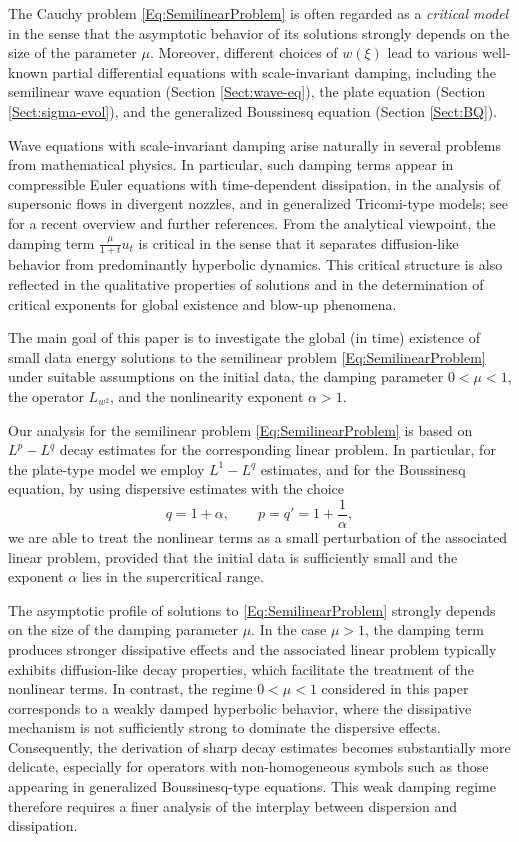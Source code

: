 \documentclass[10pt]{article}
\newcommand{\<}{\langle}
\renewcommand{\>}{\rangle}
\numberwithin{equation}{section}
\begin{document}
The Cauchy problem \eqref{Eq:SemilinearProblem} is often regarded as a \emph{critical model} in the sense that the asymptotic behavior of its solutions strongly depends on the size of the parameter $\mu$. Moreover, different choices of $w(\xi)$ lead to various well-known partial differential equations with scale-invariant damping, including the semilinear wave equation (Section \ref{Sect:wave-eq}), the plate equation (Section \ref{Sect:sigma-evol}), and the generalized Boussinesq equation (Section \ref{Sect:BQ}).


Wave equations with scale-invariant damping arise naturally in several problems from mathematical physics. In particular, such damping terms appear in compressible Euler equations with time-dependent dissipation, in the analysis of supersonic flows in divergent nozzles, and in generalized Tricomi-type models; see \cite{Li-Wang-Yin-2025} for a recent overview and further references. From the analytical viewpoint, the damping term $\frac{\mu}{1+t}u_t$ is critical in the sense that it separates diffusion-like behavior from predominantly hyperbolic dynamics. This critical structure is also reflected in the qualitative properties of solutions and in the determination of critical exponents for global existence and blow-up phenomena.


The main goal of this paper is to investigate the global (in time) existence of small data energy solutions to the semilinear problem \eqref{Eq:SemilinearProblem} under suitable assumptions on the initial data, the damping parameter $0<\mu<1$, the operator $L_{w^2}$, and the nonlinearity exponent $\alpha>1$.


Our analysis for the semilinear problem \eqref{Eq:SemilinearProblem} is based on $L^p-L^q$ decay estimates for the corresponding linear problem. In particular, for the plate-type model we employ $L^1-L^q$ estimates, and for the Boussinesq equation, by using dispersive estimates with the choice
\[ q=1+\alpha, \qquad p=q'=1+\frac{1}{\alpha}, \]
we are able to treat the nonlinear terms as a small perturbation of the associated linear problem, provided that the initial data is sufficiently small and the exponent $\alpha$ lies in the supercritical range.

 The asymptotic profile of solutions to \eqref{Eq:SemilinearProblem} strongly depends on the size of the damping parameter $\mu$. In the case $\mu>1$, the damping term produces stronger dissipative effects and the associated linear problem typically exhibits diffusion-like decay properties, which facilitate the treatment of the nonlinear terms. In contrast, the regime $0<\mu<1$ considered in this paper corresponds to a weakly damped hyperbolic behavior, where the dissipative mechanism is not sufficiently strong to dominate the dispersive effects. Consequently, the derivation of sharp decay estimates becomes substantially more delicate, especially for operators with non-homogeneous symbols such as those appearing in generalized Boussinesq-type equations. This weak damping regime therefore requires a finer analysis of the interplay between dispersion and dissipation.
%
\end{document}
